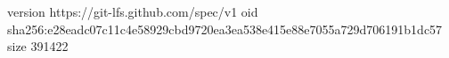 version https://git-lfs.github.com/spec/v1
oid sha256:e28eadc07c11c4e58929cbd9720ea3ea538e415e88e7055a729d706191b1dc57
size 391422
